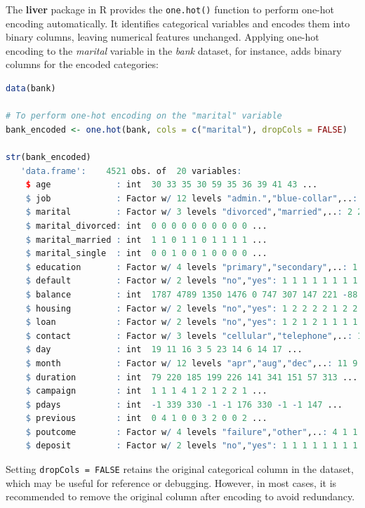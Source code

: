 \documentclass[
  11pt,
]{book}
\newcommand{\passthrough}[1]{#1}
\theoremstyle{definition}
\theoremstyle{definition}
\theoremstyle{definition}
\theoremstyle{definition}
\theoremstyle{remark}
\begin{document}
The \textbf{liver} package in R provides the \passthrough{\lstinline!one.hot()!} function to perform one-hot encoding automatically. It identifies categorical variables and encodes them into binary columns, leaving numerical features unchanged. Applying one-hot encoding to the \emph{marital} variable in the \emph{bank} dataset, for instance, adds binary columns for the encoded categories:

\begin{lstlisting}[language=R]
data(bank)

# To perform one-hot encoding on the "marital" variable
bank_encoded <- one.hot(bank, cols = c("marital"), dropCols = FALSE)

str(bank_encoded)
   'data.frame':    4521 obs. of  20 variables:
    $ age             : int  30 33 35 30 59 35 36 39 41 43 ...
    $ job             : Factor w/ 12 levels "admin.","blue-collar",..: 11 8 5 5 2 5 7 10 3 8 ...
    $ marital         : Factor w/ 3 levels "divorced","married",..: 2 2 3 2 2 3 2 2 2 2 ...
    $ marital_divorced: int  0 0 0 0 0 0 0 0 0 0 ...
    $ marital_married : int  1 1 0 1 1 0 1 1 1 1 ...
    $ marital_single  : int  0 0 1 0 0 1 0 0 0 0 ...
    $ education       : Factor w/ 4 levels "primary","secondary",..: 1 2 3 3 2 3 3 2 3 1 ...
    $ default         : Factor w/ 2 levels "no","yes": 1 1 1 1 1 1 1 1 1 1 ...
    $ balance         : int  1787 4789 1350 1476 0 747 307 147 221 -88 ...
    $ housing         : Factor w/ 2 levels "no","yes": 1 2 2 2 2 1 2 2 2 2 ...
    $ loan            : Factor w/ 2 levels "no","yes": 1 2 1 2 1 1 1 1 1 2 ...
    $ contact         : Factor w/ 3 levels "cellular","telephone",..: 1 1 1 3 3 1 1 1 3 1 ...
    $ day             : int  19 11 16 3 5 23 14 6 14 17 ...
    $ month           : Factor w/ 12 levels "apr","aug","dec",..: 11 9 1 7 9 4 9 9 9 1 ...
    $ duration        : int  79 220 185 199 226 141 341 151 57 313 ...
    $ campaign        : int  1 1 1 4 1 2 1 2 2 1 ...
    $ pdays           : int  -1 339 330 -1 -1 176 330 -1 -1 147 ...
    $ previous        : int  0 4 1 0 0 3 2 0 0 2 ...
    $ poutcome        : Factor w/ 4 levels "failure","other",..: 4 1 1 4 4 1 2 4 4 1 ...
    $ deposit         : Factor w/ 2 levels "no","yes": 1 1 1 1 1 1 1 1 1 1 ...
\end{lstlisting}

Setting \passthrough{\lstinline!dropCols = FALSE!} retains the original categorical column in the dataset, which may be useful for reference or debugging. However, in most cases, it is recommended to remove the original column after encoding to avoid redundancy.
\end{document}
